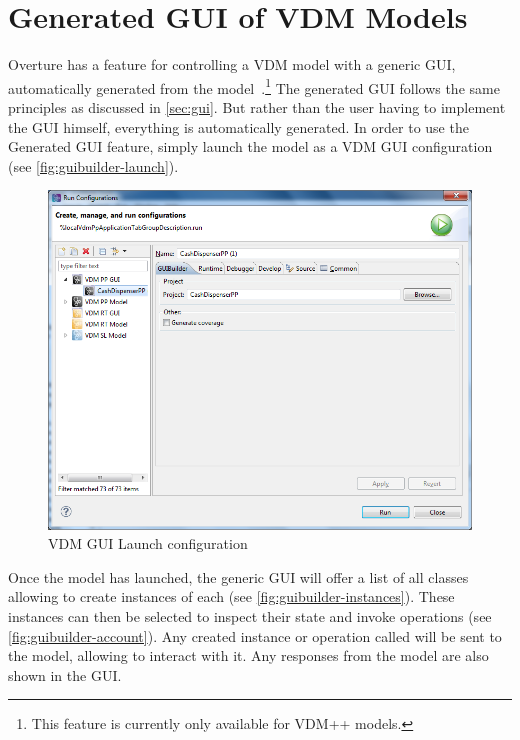 

\section{Generated GUI of VDM Models}
\label{sec:guibuilder}

Overture has a feature for controlling a VDM model with a generic GUI,
automatically generated from the model~\cite{nunes&11}.\footnote{This feature is currently only
available for VDM++ models.} The generated GUI follows the same
principles as discussed in \autoref{sec:gui}. But rather than the user having to
implement the GUI himself, everything is automatically generated.
  In order to use the Generated GUI feature, simply launch the model
as a VDM  GUI configuration (see \autoref{fig:guibuilder-launch}).


\begin{figure}[!ht]
\begin{center}
  \includegraphics[width=\textwidth]{screenDumps/guibuilder-launch}
  \caption[labelInTOC]{VDM GUI Launch configuration}
  \label{fig:guibuilder-launch}
\end{center}
\end{figure}


Once the model has launched, the generic GUI will offer a list of all
classes allowing to create instances of each (see
\autoref{fig:guibuilder-instances}). These instances can then be selected to
inspect their state and invoke operations (see
\autoref{fig:guibuilder-account}). Any created instance or operation called will
be sent to the model, allowing to interact with it. Any responses from the
model are also shown in the GUI.


